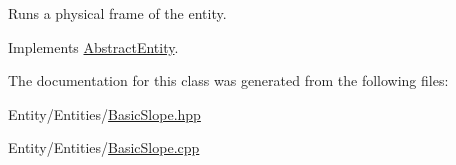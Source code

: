 Runs a physical frame of the entity. 



Implements \hyperlink{class_abstract_entity_ac5602c7978aa4eaff46aa206f06046d7}{Abstract\+Entity}.



The documentation for this class was generated from the following files\+:\begin{DoxyCompactItemize}
\item 
Entity/\+Entities/\hyperlink{_basic_slope_8hpp}{Basic\+Slope.\+hpp}\item 
Entity/\+Entities/\hyperlink{_basic_slope_8cpp}{Basic\+Slope.\+cpp}\end{DoxyCompactItemize}
